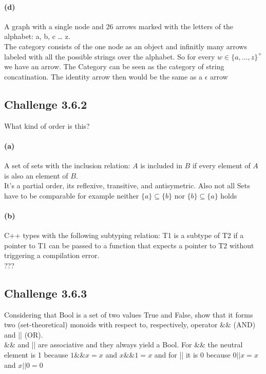\documentclass[11pt]{article}
\begin{document}
        \paragraph*{(d)} A graph with a single node and 26 arrows marked with the
        letters of the alphabet: a, b, c … z. \\
            The category consists of the one node as an object and infinitly many arrows labeled with all the possible strings over the alphabet. So for every $w \in \{a,...,z\}^+$ we have an arrow. The Category can be seen as the category of string concatination. The identity arrow then would be the same as a $\epsilon$ arrow

    \subsection*{Challenge 3.6.2}
        What kind of order is this? \\
        \paragraph*{(a)} A set of sets with the inclusion relation: $A$ is included in $B$
        if every element of $A$ is also an element of $B$.\\
        It's a partial order, its reflexive, transitive, and antisymetric. Also not all Sets have to be comparable for example neither $\{a\} \subseteq \{b\}$ nor $\{b\} \subseteq \{a\}$ holds
        \paragraph*{(b)} C++ types with the following subtyping relation: T1 is a subtype
        of T2 if a pointer to T1 can be passed to a function that
        expects a pointer to T2 without triggering a compilation error. \\
        ???

    \subsection*{Challenge 3.6.3}
        Considering that Bool is a set of two values True and False, show
        that it forms two (set-theoretical) monoids with respect to, respectively,
        operator \&\& (AND) and || (OR). \\
        \&\& and || are associative and they always yield a Bool. For \&\& the neutral element is 1 because $1 \&\& x = x$ and $x \&\& 1 = x$ and for || it is 0 because $0 || x = x$ and $x || 0 = 0$
\end{document}

